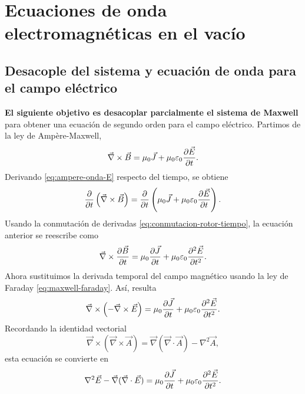 \documentclass[../main.tex]{subfiles}
\begin{document}
\chapter{Ecuaciones de onda electromagnéticas en el vacío}

\section{Desacople del sistema y ecuación de onda para el campo eléctrico}

\textbf{El siguiente objetivo es desacoplar parcialmente el sistema de Maxwell} para obtener una ecuación de segundo orden para el campo eléctrico. Partimos de la ley de Ampère-Maxwell,
\begin{equation}
    \vec \nabla \times \vec{B} = \mu_0\vec{J}+\mu_0\varepsilon_0\frac{\partial\vec{E}}{\partial t}.
    \label{eq:ampere-onda-E}
\end{equation}
Derivando \eqref{eq:ampere-onda-E} respecto del tiempo, se obtiene
\begin{equation*}
    \frac{\partial}{\partial t}\left(\vec \nabla \times \vec{B}\right)=\frac{\partial}{\partial t}\left(\mu_0\vec{J}+\mu_0\varepsilon_0\frac{\partial\vec{E}}{\partial t}\right).
\end{equation*}
Usando la conmutación de derivadas \eqref{eq:conmutacion-rotor-tiempo}, la ecuación anterior se reescribe como
\begin{equation*}
   \vec \nabla \times \frac{\partial\vec{B}}{\partial t}=\mu_0\frac{\partial\vec{J}}{\partial t}+\mu_0\varepsilon_0\frac{\partial^2\vec{E}}{\partial t^2}.
\end{equation*}
Ahora sustituimos la derivada temporal del campo magnético usando la ley de Faraday \eqref{eq:maxwell-faraday}. Así, resulta
\begin{equation*}
   \vec \nabla \times \left(-\vec\nabla\times \vec{E}\right)=\mu_0\frac{\partial\vec{J}}{\partial t}+\mu_0\varepsilon_0\frac{\partial^2\vec{E}}{\partial t^2}.
\end{equation*}
Recordando la identidad vectorial
\begin{equation}
    \vec \nabla \times (\vec \nabla \times \vec A)=\vec\nabla(\vec\nabla\cdot \vec A)-\nabla^2\vec A,
    \label{eq:identidad-rotrot}
\end{equation}
esta ecuación se convierte en
\begin{equation*}
  \nabla^2\vec E- \vec\nabla(\vec\nabla\cdot \vec{E})= \mu_0\frac{\partial\vec{J}}{\partial t}+\mu_0\varepsilon_0\frac{\partial^2\vec{E}}{\partial t^2}.
\end{equation*}
\end{document}
